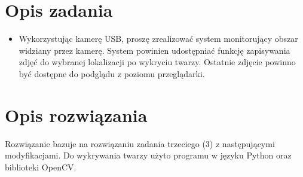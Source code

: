 
\usepackage{listings}

\maketitle
\tableofcontents

\newpage

\section{Opis zadania}
\begin{itemize}
\item Wykorzystując kamerę USB, proszę zrealizować system monitorujący
obszar widziany przez kamerę. System powinien udostępniać funkcję
zapisywania zdjęć do wybranej lokalizacji po wykryciu twarzy.
Ostatnie zdjęcie powinno być dostępne do podglądu z poziomu
przeglądarki.
\end{itemize}

\section{Opis rozwiązania}
Rozwiązanie bazuje na rozwiązaniu zadania trzeciego (3) z następującymi modyfikacjami.
Do wykrywania twarzy użyto programu w języku Python oraz biblioteki OpenCV.

